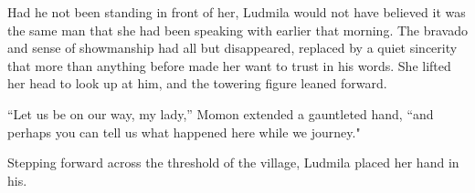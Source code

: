  

Had he not been standing in front of her, Ludmila would not have believed it was the same man that she had been speaking with earlier that morning. The bravado and sense of showmanship had all but disappeared, replaced by a quiet sincerity that more than anything before made her want to trust in his words. She lifted her head to look up at him, and the towering figure leaned forward.

 

“Let us be on our way, my lady,” Momon extended a gauntleted hand, “and perhaps you can tell us what happened here while we journey."

 

Stepping forward across the threshold of the village, Ludmila placed her hand in his.